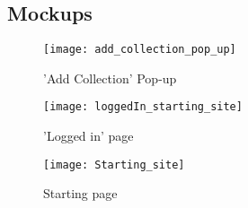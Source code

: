 \subsection{Mockups}\label{subsec:Mockups}

\begin{figure}[htbp]
    \centering
    \texttt{[image: add\_collection\_pop\_up]}
    \caption{'Add Collection' Pop-up}\label{fig:figure}
\end{figure}

\begin{figure}[htbp]
    \centering
    \texttt{[image: loggedIn\_starting\_site]}
    \caption{'Logged in' page}\label{fig:figure2}
\end{figure}

\begin{figure}[htbp]
    \centering
    \texttt{[image: Starting\_site]}
    \caption{Starting page}\label{fig:figure3}
\end{figure}
